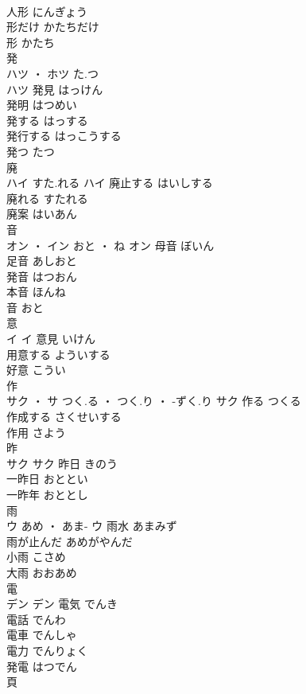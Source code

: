 \documentclass[8pt]{extreport}
\begin{document}
\begin{CJK}{UTF8}{min}
\\	人形	にんぎょう	
\\	形だけ	かたちだけ	
\\	形	かたち	
\\	発	
\\	ハツ ・ ホツ	た.つ
\\	ハツ	発見	はっけん	
\\	発明	はつめい	
\\	発する	はっする	
\\	発行する	はっこうする	
\\	発つ	たつ	
\\	廃	
\\	ハイ	すた.れる	ハイ	廃止する	はいしする	
\\	廃れる	すたれる	
\\	廃案	はいあん	
\\	音	
\\	オン ・ イン	おと ・ ね	オン	母音	ぼいん	
\\	足音	あしおと	
\\	発音	はつおん	
\\	本音	ほんね	
\\	音	おと	
\\	意	
\\	イ		イ	意見	いけん	
\\	用意する	よういする	
\\	好意	こうい	
\\	作	
\\	サク ・ サ	つく.る ・ つく.り ・ -ずく.り	サク	作る	つくる	
\\	作成する	さくせいする	
\\	作用	さよう	
\\	昨	
\\	サク		サク	昨日	きのう	
\\	一昨日	おととい	
\\	一昨年	おととし	
\\	雨	
\\	ウ	あめ ・ あま-	ウ	雨水	あまみず	
\\	雨が止んだ	あめがやんだ	
\\	小雨	こさめ	
\\	大雨	おおあめ	
\\	電	
\\	デン		デン	電気	でんき	
\\	電話	でんわ	
\\	電車	でんしゃ	
\\	電力	でんりょく	
\\	発電	はつでん	
\\	頁	

\end{CJK}
\end{document}
